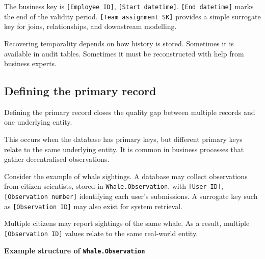 \documentclass[10pt,openany,10pt]{book}
\begin{document}
The business key is \texttt{{[}Employee\ ID{]}},
\texttt{{[}Start\ datetime{]}}. \texttt{{[}End\ datetime{]}} marks the
end of the validity period. \texttt{{[}Team\ assignment\ SK{]}} provides
a simple surrogate key for joins, relationships, and downstream
modelling.

Recovering temporality depends on how history is stored. Sometimes it is
available in audit tables. Sometimes it must be reconstructed with help
from business experts.

\subsection{Defining the primary
record}\label{defining-the-primary-record}

Defining the primary record closes the quality gap between multiple
records and one underlying entity.

This occurs when the database has primary keys, but different primary
keys relate to the same underlying entity. It is common in business
processes that gather decentralised observations.

Consider the example of whale sightings. A database may collect
observations from citizen scientists, stored in
\texttt{Whale.Observation}, with \texttt{{[}User\ ID{]}},
\texttt{{[}Observation\ number{]}} identifying each user's submissions.
A surrogate key such as \texttt{{[}Observation\ ID{]}} may also exist
for system retrieval.

Multiple citizens may report sightings of the same whale. As a result,
multiple \texttt{{[}Observation\ ID{]}} values relate to the same
real-world entity.

\textbf{Example structure of \texttt{Whale.Observation}}
\end{document}
